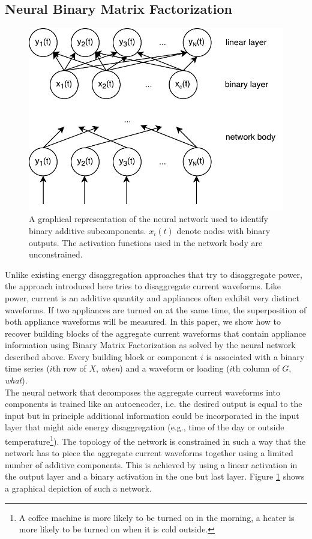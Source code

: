 \subsection{Neural Binary Matrix Factorization}
 \begin{figure}[!ht]
\centering
\includegraphics[width=0.75\linewidth]{bolt/neural_net.pdf}
\caption[BOLT: A graphical representation of the neural network used to identify binary additive subcomponents.]{A graphical representation of the neural network used to identify binary additive subcomponents. $x_i(t)$ denote nodes with binary outputs. The activation functions used in the network body are unconstrained.}
\label{fig_sim}
\end{figure}
Unlike existing energy disaggregation approaches that try to disaggregate power, the approach introduced here tries to disaggregate current waveforms. Like power, current is an additive quantity and appliances often exhibit very distinct waveforms. If two appliances are turned on at the same time, the superposition of both appliance waveforms will be measured. In this paper, we show how to recover building blocks of the aggregate current waveforms that contain appliance information using Binary Matrix Factorization as solved by the neural network described above. Every building block or component $i$ is associated with a binary time series ($i$th row of $X$, \emph{when}) and a waveform or loading ($i$th column of $G$, \emph{what}).\\
The neural network that decomposes the aggregate current waveforms into components is trained like an autoencoder, i.e. the desired output is equal to the input but in principle additional information could be incorporated in the input layer that might aide energy disaggregation (e.g., time of the day or outside temperature\footnote{A coffee machine is more likely to be turned on in the morning, a heater is more likely to be turned on when it is cold outside.}). The topology of the network is constrained in such a way that the network has to piece the aggregate current waveforms together using a limited number of additive components. This is achieved by using a linear activation in the output layer and a binary activation in the one but last layer. Figure \ref{fig_sim} shows a graphical depiction of such a network.\\
